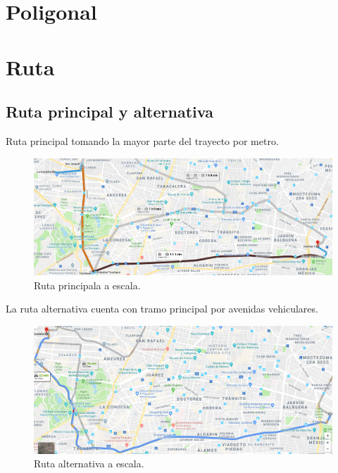 \documentclass[12pt,letterpaper]{article}
\begin{document}


\newpage
\tableofcontents
\listoffigures
\listoftables

\newpage
\section{Poligonal}

\newpage
\section{Ruta}
\subsection{Ruta principal y alternativa}
Ruta principal tomando la mayor parte del trayecto por metro.
\begin{figure}[ht]
    \centering
    \includegraphics[width=.9\textwidth]{f2.png}
    \caption{Ruta principala a escala.}
\end{figure}

La ruta alternativa cuenta con tramo principal por avenidas 
vehiculares.
\begin{figure}[ht]
    \centering
    \includegraphics[width=.9\textwidth]{f3.png}
    \caption{Ruta alternativa a escala.}
\end{figure}

\newpage
\end{document}
